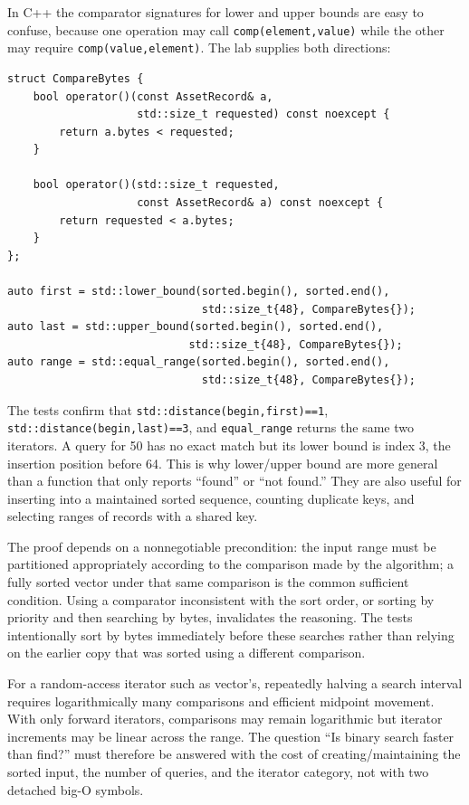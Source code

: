 In C++ the comparator signatures for lower and upper bounds are easy to confuse, because one operation may call \texttt{comp(element,value)} while the other may require \texttt{comp(value,element)}. The lab supplies both directions:

\begin{verbatim}
struct CompareBytes {
    bool operator()(const AssetRecord& a,
                    std::size_t requested) const noexcept {
        return a.bytes < requested;
    }

    bool operator()(std::size_t requested,
                    const AssetRecord& a) const noexcept {
        return requested < a.bytes;
    }
};

auto first = std::lower_bound(sorted.begin(), sorted.end(),
                              std::size_t{48}, CompareBytes{});
auto last = std::upper_bound(sorted.begin(), sorted.end(),
                            std::size_t{48}, CompareBytes{});
auto range = std::equal_range(sorted.begin(), sorted.end(),
                              std::size_t{48}, CompareBytes{});
\end{verbatim}

The tests confirm that \texttt{std::distance(begin,first)==1}, \texttt{std::distance(begin,last)==3}, and \texttt{equal\_range} returns the same two iterators. A query for 50 has no exact match but its lower bound is index 3, the insertion position before 64. This is why lower/upper bound are more general than a function that only reports ``found'' or ``not found.'' They are also useful for inserting into a maintained sorted sequence, counting duplicate keys, and selecting ranges of records with a shared key.

The proof depends on a nonnegotiable precondition: the input range must be partitioned appropriately according to the comparison made by the algorithm; a fully sorted vector under that same comparison is the common sufficient condition. Using a comparator inconsistent with the sort order, or sorting by priority and then searching by bytes, invalidates the reasoning. The tests intentionally sort by bytes immediately before these searches rather than relying on the earlier copy that was sorted using a different comparison.

For a random-access iterator such as vector's, repeatedly halving a search interval requires logarithmically many comparisons and efficient midpoint movement. With only forward iterators, comparisons may remain logarithmic but iterator increments may be linear across the range. The question ``Is binary search faster than find?'' must therefore be answered with the cost of creating/maintaining the sorted input, the number of queries, and the iterator category, not with two detached big-O symbols.


